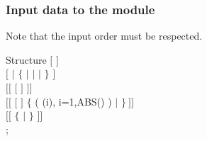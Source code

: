 \clearpage

\vskip 0.2cm
\subsubsection{Input data to the  module}\label{sect:strtinst}

\noindent
Note that the input order must be respected. \\

\begin{DataStructure}{Structure }
$[$   $]$ \\
$[$    $|$   $\{$  $|$  $|$  $|$  $\}$ $]$ \\
$[[$  $[$  $]$    $]]$ \\
$[[$  $[$  $]$    $\{$ 
( (i), i=1,ABS() ) $|$   $\}~]]$ \\
$[[$     
$\{$  $|$  $\}$ $]]$ \\
;
\end{DataStructure}

